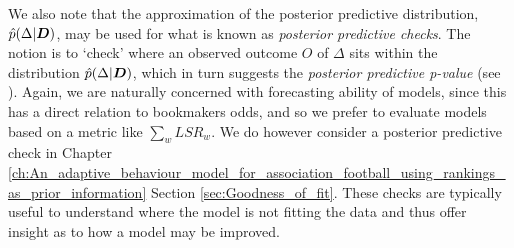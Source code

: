 We also note that the approximation of the posterior predictive distribution, \(\hat{p}(\Delta | \boldsymbol{D})\), may be used
for what is known as \textit{posterior predictive checks}. The notion is to `check' where an observed outcome \(O\) of
\(\Delta\) sits within the distribution \(\hat{p}(\Delta | \boldsymbol{D})\), which in turn suggests the \textit{posterior
predictive p-value} (see \cite{meng1994, gelman2013}). Again, we are naturally concerned with forecasting ability of
models, since this has a direct relation to bookmakers odds, and so we prefer to evaluate models based on a metric like
\(\sum_w LSR_w\). We do however consider a posterior predictive check in Chapter
\ref{ch:An_adaptive_behaviour_model_for_association_football_using_rankings_as_prior_information} Section
\ref{sec:Goodness_of_fit}. These checks are typically useful to understand where the model is not fitting the data and
thus offer insight as to how a model may be improved.


